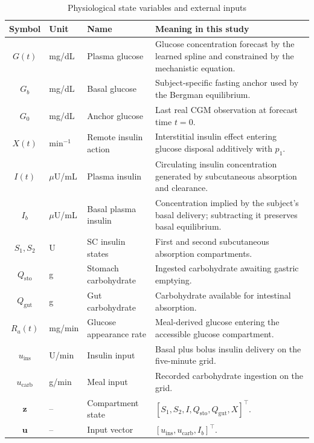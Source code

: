 \documentclass[journal]{IEEEtran}
\begin{document}
\begin{table}[t]
\centering
\caption{Physiological state variables and external inputs}
\label{tab:states}
\footnotesize
\begin{tabular}{clp{5cm}p{7cm}}
\toprule
Symbol & Unit & Name & Meaning in this study \\
\midrule
$G(t)$ & mg/dL & Plasma glucose & Glucose concentration forecast by the learned spline and constrained by the mechanistic equation. \\
$G_b$ & mg/dL & Basal glucose & Subject-specific fasting anchor used by the Bergman equilibrium. \\
$G_0$ & mg/dL & Anchor glucose & Last real CGM observation at forecast time $t=0$. \\
$X(t)$ & min$^{-1}$ & Remote insulin action & Interstitial insulin effect entering glucose disposal additively with $p_1$. \\
$I(t)$ & $\mu$U/mL & Plasma insulin & Circulating insulin concentration generated by subcutaneous absorption and clearance. \\
$I_b$ & $\mu$U/mL & Basal plasma insulin & Concentration implied by the subject's basal delivery; subtracting it preserves basal equilibrium. \\
$S_1, S_2$ & U & SC insulin states & First and second subcutaneous absorption compartments. \\
$Q_{\text{sto}}$ & g & Stomach carbohydrate & Ingested carbohydrate awaiting gastric emptying. \\
$Q_{\text{gut}}$ & g & Gut carbohydrate & Carbohydrate available for intestinal absorption. \\
$R_a(t)$ & mg/min & Glucose appearance rate & Meal-derived glucose entering the accessible glucose compartment. \\
$u_{\text{ins}}$ & U/min & Insulin input & Basal plus bolus insulin delivery on the five-minute grid. \\
$u_{\text{carb}}$ & g/min & Meal input & Recorded carbohydrate ingestion on the grid. \\
$\mathbf{z}$ & -- & Compartment state & $[S_1, S_2, I, Q_{\text{sto}}, Q_{\text{gut}}, X]^\top$. \\
$\mathbf{u}$ & -- & Input vector & $[u_{\text{ins}}, u_{\text{carb}}, I_b]^\top$. \\
\bottomrule
\end{tabular}
\end{table}
\end{document}
